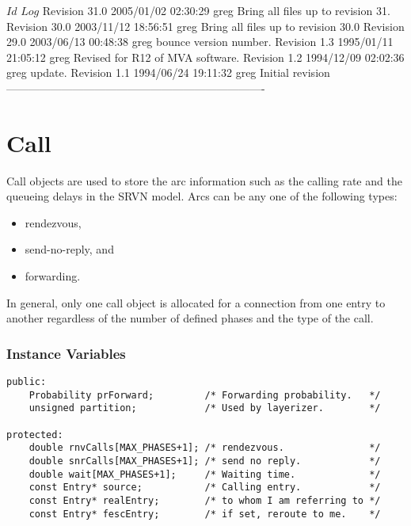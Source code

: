 \C 
\C $Id$
\C 
\C $Log$
\C Revision 31.0  2005/01/02 02:30:29  greg
\C Bring all files up to revision 31.
\C
\C Revision 30.0  2003/11/12 18:56:51  greg
\C Bring all files up to revision 30.0
\C
\C Revision 29.0  2003/06/13 00:48:38  greg
\C bounce version number.
\C
\C Revision 1.3  1995/01/11 21:05:12  greg
\C Revised for R12 of MVA software.
\C
\C Revision 1.2  1994/12/09  02:02:36  greg
\C update.
\C
\C Revision 1.1  1994/06/24  19:11:32  greg
\C Initial revision
\C
\C ----------------------------------------------------------------------
\section{Call}
\label{sec:call}

Call objects are used to store the arc information such as the calling
rate and the queueing delays in the SRVN model.  Arcs can be any one
of the following types:
\begin{itemize}
\item rendezvous,
\item send-no-reply, and
\item forwarding.
\end{itemize}
In general, only one call object is allocated for a connection from
one entry to another regardless of the number of defined phases and
the type of the call.

\subsubsection{Instance Variables}
\label{sec:call-ivars}
\begin{verbatim}
public:
    Probability prForward;         /* Forwarding probability.   */
    unsigned partition;            /* Used by layerizer.        */
    
protected:
    double rnvCalls[MAX_PHASES+1]; /* rendezvous.               */
    double snrCalls[MAX_PHASES+1]; /* send no reply.            */
    double wait[MAX_PHASES+1];     /* Waiting time.             */
    const Entry* source;           /* Calling entry.            */
    const Entry* realEntry;        /* to whom I am referring to */
    const Entry* fescEntry;        /* if set, reroute to me.    */
\end{verbatim}


